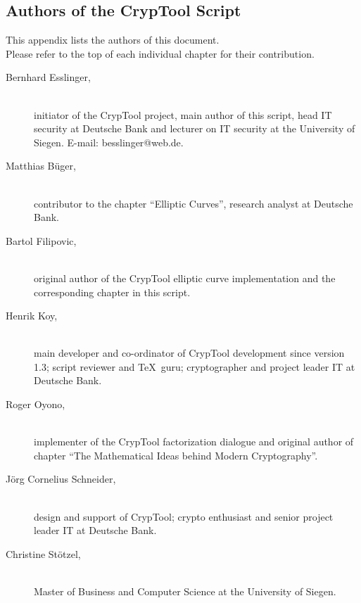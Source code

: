 
\hypertarget{appendix-authors}{}
\subsection{Authors of the CrypTool Script}
\label{s:appendix-authors}

This appendix lists the authors of this document.\\
Please refer to the top of each individual chapter for their contribution.

\begin{description}

\item[Bernhard Esslinger,] \mbox{}\\
initiator of the CrypTool project, main author of this script, head IT
security at Deutsche Bank and lecturer on IT security at the University
of Siegen.
E-mail: besslinger@web.de.
 
\item[Matthias B\"uger,] \mbox{}\\ 
contributor to the chapter ``Elliptic Curves'', research analyst at
Deutsche Bank.

\item[Bartol Filipovic,] \mbox{}\\
original author of the CrypTool elliptic curve
implementation and the corresponding chapter in this script.

\item[Henrik Koy, ] \mbox{}\\
main developer and co-ordinator of CrypTool development
since version 1.3; script reviewer and \TeX\ guru; cryptographer 
and project leader IT at Deutsche Bank.

\item[Roger Oyono, ] \mbox{}\\
implementer of the CrypTool factorization dialogue and
original author of chapter ``The Mathematical Ideas behind Modern
Cryptography''.

\item[J\"org Cornelius Schneider,] \mbox{}\\
design and support of CrypTool; crypto
enthusiast and senior project leader IT at Deutsche Bank.

\item[Christine St\"otzel,] \mbox{}\\
Master of Business and Computer Science at the University of Siegen.

\end{description}





